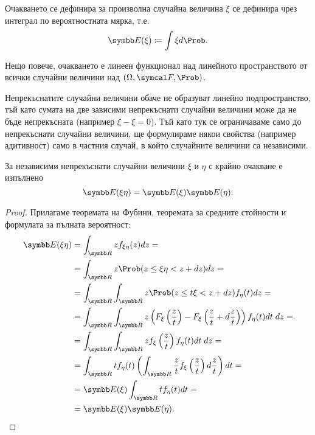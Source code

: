 \documentclass[
  headings=standardclasses,
  bibliography=totocnumbered,
]{scrartcl}
\begin{document}
\begin{remark}
  Очакването се дефинира за произволна случайна величина \( \xi \) се дефинира чрез интеграл по вероятностната мярка, т.е.
  \begin{equation*}
    \Expect(\xi) \coloneqq \int \xi d\Prob.
  \end{equation*}

  Нещо повече, очакването е линеен функционал над линейното пространството от всички случайни величини над \( (\Omega, \F, \Prob) \).

  Непрекъснатите случайни величини обаче не образуват линейно подпространство, тъй като сумата на две зависими непрекъснати случайни величини може да не бъде непрекъсната (например \( \xi - \xi = 0 \)). Тъй като тук се ограничаваме само до непрекъснати случайни величини, ще формулираме някои свойства (например адитивност) само в частния случай, в който случайните величини са независими.
\end{remark}

\begin{proposition}\label{thm:expectation_of_independent_product}
  За независими непрекъснати случайни величини \( \xi \) и \( \eta \) с крайно очакване е изпълнено
  \begin{equation*}
    \Expect(\xi \eta) = \Expect(\xi) \Expect(\eta).
  \end{equation*}
\end{proposition}
\begin{proof}
  Прилагаме теоремата на Фубини, теоремата за средните стойности и формулата за пълната вероятност:
  \begin{align*}
    \Expect(\xi \eta)
    &=
    \int_{\R} z f_{\xi \eta}(z) dz
    = \\ &=
    \int_{\R} z \Prob(z \leq \xi \eta < z + dz) dz
    = \\ &=
    \int_{\R} \int_{\R} z \Prob(z \leq t \xi < z + dz) f_\eta(t) dz
    = \\ &=
    \int_{\R} \int_{\R} z \left( F_\xi\left(\frac z t \right) - F_\xi\left(\frac z t + d\frac z t \right) \right) f_\eta(t) dt \; dz
    = \\ &=
    \int_{\R} \int_{\R} z f_\xi \left(\frac z t \right) f_\eta(t) dt \; dz
    = \\ &=
    \int_{\R} t f_\eta(t) \left(\int_{\R} \frac z t f_\xi \left(\frac z t \right) d\frac z t \right) dt
    = \\ &=
    \Expect(\xi) \int_{\R} t f_\eta(t) dt
    = \\ &=
    \Expect(\xi) \Expect(\eta).
  \end{align*}
\end{proof}
\end{document}
